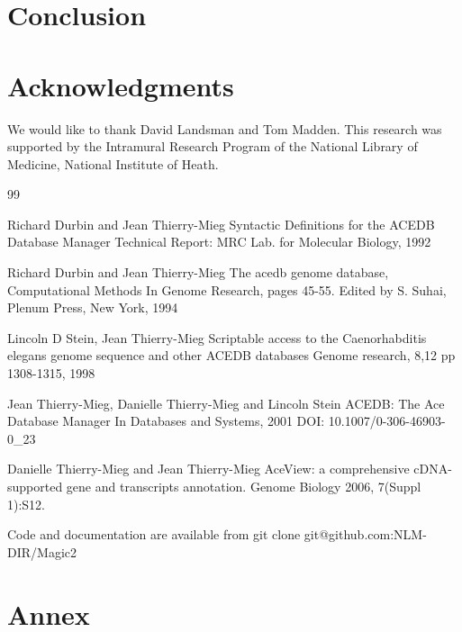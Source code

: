 \documentclass[11pt]{article}
\begin{document}
\section{Conclusion}



\section*{Acknowledgments}

We would like to thank David Landsman and Tom Madden.
This research was supported by the Intramural Research Program of the National Library of Medicine, National Institute of Heath.

\begin{thebibliography}{99}

Richard Durbin and Jean Thierry-Mieg
Syntactic Definitions for the ACEDB Database Manager
Technical Report: MRC Lab. for Molecular Biology, 1992

Richard Durbin and Jean Thierry-Mieg
The acedb genome database,
Computational Methods In Genome Research, pages 45-55.
Edited by S. Suhai, Plenum Press, New York, 1994

Lincoln D Stein, Jean Thierry-Mieg
Scriptable access to the Caenorhabditis elegans genome sequence and other ACEDB databases
Genome research, 8,12 pp 1308-1315, 1998

Jean Thierry-Mieg, Danielle Thierry-Mieg and Lincoln Stein
ACEDB: The Ace Database Manager
In Databases and Systems, 2001
DOI: 10.1007/0-306-46903-0\_23


Danielle Thierry-Mieg and Jean Thierry-Mieg
AceView: a comprehensive cDNA-supported gene and transcripts annotation.
Genome Biology 2006, 7(Suppl 1):S12.  

Code and documentation are available from  
git clone git@github.com:NLM-DIR/Magic2

\end{thebibliography}


\appendix
\section {Annex}
\end{document}
